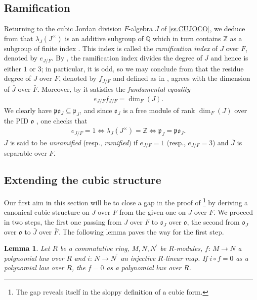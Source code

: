 \documentclass{amsart}
\newtheorem{lem}[equation]{Lemma}
\theoremstyle{definition} %
\theoremstyle{remark} %
\newcommand{\ZZ}{\mathbb{Z}}
\newcommand{\IZ}{\ZZ}
\newcommand{\QQ}{\mathbb{Q}}
\newcommand{\IQ}{\QQ}
\newcommand{\mfo}{\mathfrak{o}}
\newcommand{\mfp}{\mathfrak{p}}
\renewcommand{\:}{\colon\,}
\numberwithin{equation}{section}
\begin{document}
\subsection{Ramification} \label{ss.RAMIF} Returning to the cubic Jordan division $F$-algebra $J$ of \ref{ss.CUJOCO}, we deduce from \cite[Korollar of Lemma~3.1]{MR0347922} that $\lambda_J(J^\times)$ is an additive subgroup of $\IQ$ which in turn contains $\IZ$ as a subgroup of finite index \cite[5.3]{MR0347922}. This index is called the \emph{ramification index} of $J$ over $F$, denoted by $e_{J/F}$. By \cite[Kor.~1 of Prop.~6.4]{MR0347922}, the ramification index divides the degree of $J$ and hence is either $1$ or $3$; in particular, it is odd, so we may conclude from \cite[Satz~6.3(c)]{MR0347922} that the residue degree of $J$ over $F$, denoted by $f_{J/F}$ and defined as in \cite[6.3]{MR0347922}, agrees with the dimension of $\bar J$ over $\bar F$. Moreover, by \cite[Satz~6.3(d)]{MR0347922} it satisfies the \emph{fundamental equality}
\begin{align}
\label{FUNDEQ} e_{J/F}f_{J/F} = \dim_F(J).
\end{align}
We clearly have $\mfp\mfo_J \subseteq \mfp_J$, and since $\mfo_J$ is a free module of rank $\dim_F(J)$ over the PID $\mfo$ \cite[Satz~6.3(a)]{MR0347922}, one checks  that
\begin{align}
\label{RAMONE} e_{J/F} = 1 \Longleftrightarrow \lambda_J(J^\times) = \IZ \Longleftrightarrow \mfp_J= \mfp\mfo_J.
\end{align}
$J$ is said to be \emph{unramified} (resp., \emph{ramified}) if $e_{J/F} = 1$ (resp., $e_{J/F} = 3$) and $\bar J$ is separable over $\bar F$.

\subsection{Extending the cubic structure} \label{ss.EXTCUB} Our first aim in this section will be to close a gap in the proof of \cite[Prop.~3]{MR0379620}\footnote{The gap reveals itself in the sloppy definition of a cubic form.} by deriving a canonical cubic structure on $\bar J$ over $\bar F$ from the given one on $J$ over $F$. We proceed in two steps, the first one passing from $J$ over $F$ to $\mfo_J$ over $\mfo$, the second from $\mfo_J$ over $\mfo$ to $\bar J$ over $\bar F$. The following lemma paves the way for the first step.

\begin{lem} \label{l.VANPOL}
Let $R$ be a commutative ring, $M,N,N^\prime$ be $R$-modules, $f\:M \to N$ a polynomial law over $R$ and $i\:N \to N^\prime$ an injective $R$-linear map. If $i \circ f = 0$ as a polynomial law over $R$, the $f = 0$ as a polynomial law over $R$.
\end{lem}
\end{document}
